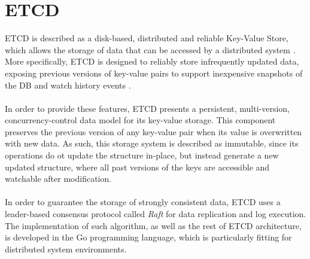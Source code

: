 \section{ETCD}
ETCD is described as a disk-based, distributed and reliable Key-Value Store, which allows the storage of data that can be accessed by a distributed system \cite{site:etcd-desc}. More specifically, ETCD is designed to reliably store infrequently updated data, exposing previous versions of key-value pairs to support inexpensive snapshots of the DB and watch history events \cite{site:etcd-data-model}. \\ \\
In order to provide these features, ETCD presents a persistent, multi-version, concurrency-control data model for its key-value storage. This component preserves the previous version of any key-value pair when its value is overwritten with new data. As such, this storage system is described as immutable, since its operations do ot update the structure in-place, but instead generate a new updated structure, where all past versions of the keys are accessible and watchable after modification. \\ \\
In order to guarantee the storage of strongly consistent data, ETCD uses a leader-based consensus protocol called \textit{Raft} for data replication and log execution. The implementation of such algorithm, as well as the rest of ETCD architecture, is developed in the Go programming language, which is particularly fitting for distributed system environments.


